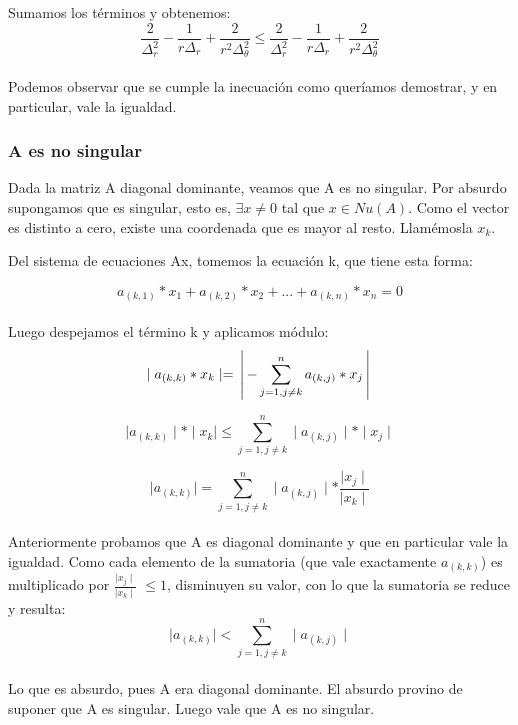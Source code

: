 Sumamos los términos y obtenemos: \\
$$\frac{2}{\Delta^2_r}-\frac{1}{r \Delta_r}+\frac{2}{r^2 \Delta^2_\theta} \leq \frac{2}{\Delta^2_r}-\frac{1}{r \Delta_r}+\frac{2}{r^2 \Delta^2_\theta}$$ \\
Podemos observar que se cumple la inecuación como queríamos demostrar, y en particular, vale la igualdad.



\subsubsection{A es no singular}
Dada la matriz A diagonal dominante, veamos que A es no singular.
Por absurdo supongamos que es singular, esto es, $\exists x\neq 0$ tal que $x \in Nu(A)$.
Como el vector es distinto a cero, existe una coordenada que es mayor al resto. Llamémosla $x_{k}$.


Del sistema de ecuaciones Ax, tomemos la ecuación k, que tiene esta forma:                  

$$ a_{(k, 1)} * x_{1} + a_{(k, 2)} * x_{2} +... + a_{(k, n)} * x_{n} = 0 $$\\

Luego despejamos el término k y aplicamos módulo:\\

 $$ \mid a_{(k, k)} * x_{k} \mid  =  \left \arrowvert - \sum_{j=1,j\neq k}^{n}  a_{(k,j)} * x_{j} \right \arrowvert $$

 $$ \mid a_{(k, k)}\mid * \mid x_{k} \mid \leq \sum_{j=1,j\neq k}^{n} \mid a_{(k,j)}\mid * \mid x_{j} \mid $$


 $$ \mid a_{(k, k)}\mid  = \sum_{j=1,j\neq k}^{n} \mid a_{(k,j)}\mid *  \frac{\mid x_{j} \mid}{\mid x_{k} \mid}$$\\

Anteriormente probamos que A es diagonal dominante y que en particular vale la igualdad. Como cada elemento de la sumatoria (que vale exactamente $a_{(k, k)}$) es multiplicado por $\frac{\mid x_{j} \mid}{\mid x_{k} \mid}$ $\leq 1$, disminuyen su valor, con lo que la sumatoria se reduce y resulta:\\

$$\mid a_{(k,k)} \mid < \sum_{j=1, j\neq k}^{n}\mid a_{(k,j)} \mid $$\\

Lo que es absurdo, pues A era diagonal dominante. El absurdo provino de suponer que A es singular. Luego vale que A es no singular.

